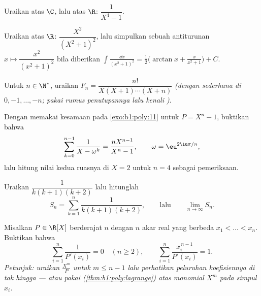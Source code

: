 \begin{exercise}[$\star\star$]\label{exo:b1:fractions:4}
Uraikan atas $\C$, lalu atas $\R$: $\dfrac{1}{X^4 - 1}$.
\end{exercise}

\begin{exercise}[$\star\star$]\label{exo:b1:fractions:5}
Uraikan atas $\R$: $\dfrac{X^2}{(X^2 + 1)^2}$, lalu simpulkan sebuah
antiturunan $x \mapsto \dfrac{x^2}{(x^2+1)^2}$ bila diberikan
$\int \frac{\dd x}{(x^2+1)^2} = \frac12\bigl(\arctan x +
\frac{x}{x^2+1}\bigr) + C$.
\end{exercise}

\begin{exercise}[$\star\star$]\label{exo:b1:fractions:6}
Untuk $n \in \N^*$, uraikan $F_n = \dfrac{n!}{X(X+1)\cdots(X+n)}$
\emph{(dengan  sederhana di $0, -1, \dots, -n$; pakai rumus penutupannya
lalu kenali )}.
\end{exercise}

\begin{exercise}[$\star\star$]\label{exo:b1:fractions:7}
Dengan memakai kesamaan pada \cref{exo:b1:poly:11} untuk $P = X^n - 1$,
buktikan bahwa
\[
\sum_{k=0}^{n-1} \frac{1}{X - \omega^k} = \frac{n X^{n-1}}{X^n - 1},
\qquad \omega = \eu^{2\iu\pi/n},
\]
lalu hitung nilai kedua ruasnya di $X = 2$ untuk $n = 4$ sebagai pemeriksaan.
\end{exercise}

\begin{exercise}[$\star\star$]\label{exo:b1:fractions:8}
Uraikan $\dfrac{1}{k(k+1)(k+2)}$ lalu hitunglah
\[
S_n = \sum_{k=1}^{n} \frac{1}{k(k+1)(k+2)},
\qquad\text{lalu}\qquad
\lim_{n \to \infty} S_n .
\]
\end{exercise}

\begin{exercise}[$\star\star\star$]\label{exo:b1:fractions:9}
Misalkan $P \in \R[X]$  berderajat $n$ dengan $n$ akar real yang berbeda
$x_1 < \dots < x_n$. Buktikan bahwa
\[
\sum_{i=1}^{n} \frac{1}{P'(x_i)} = 0 \quad (n \geq 2),
\qquad
\sum_{i=1}^{n} \frac{x_i^{\,n-1}}{P'(x_i)} = 1 .
\]
\emph{Petunjuk: uraikan $\frac{X^m}{P}$ untuk $m \leq n - 1$ lalu perhatikan
peluruhan koefisiennya di tak hingga --- atau pakai 
(\cref{thm:b1:poly:lagrange}) atas monomial $X^m$ pada simpul
$x_i$.}
\end{exercise}

